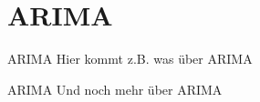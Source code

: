 \section{ARIMA}

\begin{frame}{ARIMA}
    Hier kommt z.B. was \"uber ARIMA
\end{frame}

\begin{frame}{ARIMA}
    Und noch mehr \"uber ARIMA
\end{frame}